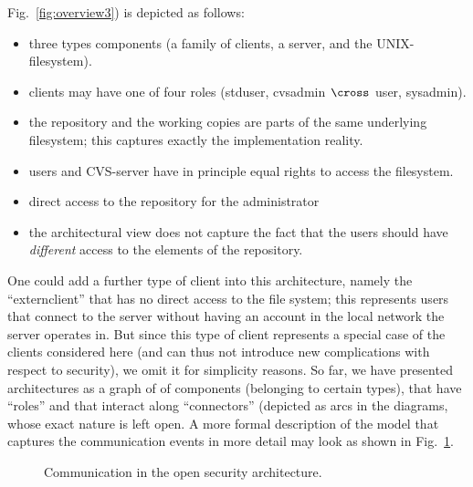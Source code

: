  Fig.~\ref{fig:overview3}) is depicted as follows:
\begin{itemize}
\item three types components (a family of clients, a server, and the
  UNIX-filesystem).
\item clients may have one of four roles ({stduser, cvsadmin} $\cross$
  {user, sysadmin}).
\item the repository and the working copies are parts of the same
  underlying filesystem; this captures exactly the implementation
  reality.
\item users and CVS-server have in principle equal rights to access the
  filesystem.
\item direct access to the repository for the administrator
\item the architectural view does not capture the fact that the users
  should have \emph{different} access to the elements of the
  repository.
\end{itemize}    
One could add a further type of client into this architecture, namely
the ``externclient'' that has no direct access to the file system;
this represents users that connect to the server without having an
account in the local network the server operates in. But since this
type of client represents a special case of the clients considered
here (and can thus not introduce new complications with respect to
security), we omit it for simplicity reasons.  So far, we have
presented architectures as a graph of of components (belonging to
certain types), that have ``roles'' and that interact along
``connectors'' (depicted as arcs in the diagrams, whose exact nature
is left open.  A more formal description of the model that captures
the communication events in more detail may look as shown in
Fig.~\ref{fig:overview4}.
  \begin{figure}
    \center 
    \caption{Communication in the open security architecture.\label{fig:overview4}}
  \end{figure}
